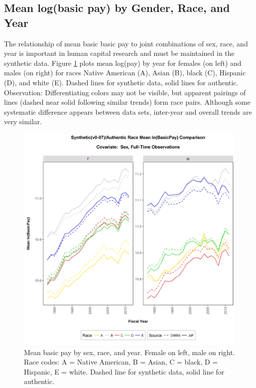 \documentclass[10pt, letterpaper]{article}
\begin{document}
\begin{spacing}{1.0}
\clearpage

\subsection{Mean log(basic pay) by Gender, Race, and Year}

The relationship of mean basic basic pay to joint combinations of sex, race, and year is important in human capital research and must be maintained in the synthetic data.  Figure \ref{figure:RaceLogPayBySex-FY} plots mean log(pay) by year for females (on left) and males (on right) for races Native American (A), Asian (B), black (C), Hispanic (D), and white (E).  Dashed lines for synthetic data, solid lines for authentic.\\

Observation:  Differentiating colors may not be visible, but apparent pairings of lines (dashed near solid following similar trends) form race pairs.  Although some systematic difference appears between data sets, inter-year and overall trends are very similar.\\

\begin{figure}[h]
    \centering
    \includegraphics[width=6.5in, trim={0 0 0 0.75in}, clip]{RaceLogPayBySex-FY.png}
    \caption{Mean basic pay by sex, race, and year.  Female on left, male on right.  Race codes:  A = Native American, B = Asian, C = black, D = Hispanic, E = white.  Dashed line for synthetic data, solid line for authentic.}
    \label{figure:RaceLogPayBySex-FY}
\end{figure}


\end{spacing}
\end{document}
